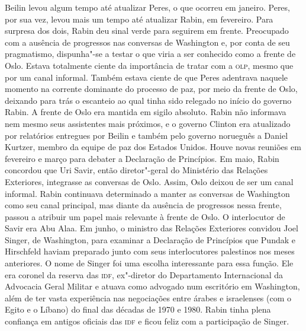 Beilin levou algum tempo até atualizar Peres, o que ocorreu em janeiro.
Peres, por sua vez, levou mais um tempo até atualizar Rabin, em
fevereiro. Para surpresa dos dois, Rabin deu sinal verde para seguirem
em frente. Preocupado com a ausência de progressos nas conversas de
Washington e, por conta de seu pragmatismo, dispunha"-se a testar o que
viria a ser conhecido como a frente de Oslo. Estava totalmente ciente da
importância de tratar com a \textsc{olp}, mesmo que por um canal informal. Também
estava ciente de que Peres adentrava naquele momento na corrente
dominante do processo de paz, por meio da frente de Oslo, deixando para
trás o escanteio ao qual tinha sido relegado no início do governo Rabin.
A frente de Oslo era mantida em sigilo absoluto. Rabin não informava nem
mesmo seus assistentes mais próximos, e o governo Clinton era atualizado
por relatórios entregues por Beilin e também pelo governo norueguês a
Daniel Kurtzer, membro da equipe de paz dos Estados Unidos. Houve novas
reuniões em fevereiro e março para debater a Declaração de Princípios.
Em maio, Rabin concordou que Uri Savir, então diretor"-geral do
Ministério das Relações Exteriores, integrasse as conversas de Oslo.
Assim, Oslo deixou de ser um canal informal. Rabin continuava
determinado a manter as conversas de Washington como seu canal
principal, mas diante da ausência de progressos nessa frente, passou a
atribuir um papel mais relevante à frente de Oslo. O interlocutor de
Savir era Abu Alaa. Em junho, o ministro das Relações Exteriores
convidou Joel Singer, de Washington, para examinar a Declaração de
Princípios que Pundak e Hirschfeld haviam preparado junto com seus
interlocutores palestinos nos meses anteriores. O nome de Singer foi uma
escolha interessante para essa função. Ele era coronel da reserva das
\textsc{idf}, ex"-diretor do Departamento Internacional da Advocacia Geral Militar
e atuava como advogado num escritório em Washington, além
de ter vasta experiência nas negociações entre árabes e israelenses (com
o Egito e o Líbano) do final das décadas de 1970 e 1980. Rabin tinha
plena confiança em antigos oficiais das \textsc{idf} e ficou feliz com a
participação de Singer.


